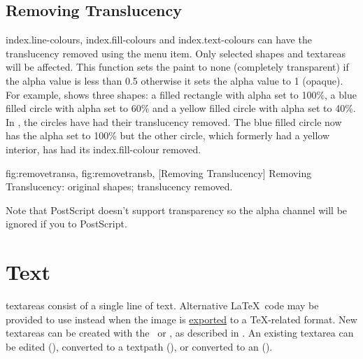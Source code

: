 
\section{Removing Translucency}\label{sec:removetrans}


\Glspl{index.line-colour}, \glspl{index.fill-colour} and
\glspl{index.text-colour} can have the \gls{translucency} removed using
the  menu item. Only selected
\glspl{shape} and \glspl{textarea} will be affected. This function
sets the paint to none (completely \gls{transparent}) if the alpha value
is less than 0.5 otherwise it sets the alpha value to 1 (opaque).
For example,  shows three shapes: a
filled rectangle with alpha set to 100\%, a blue filled circle with
alpha set to 60\% and a yellow filled circle with alpha set to 40\%.
In , the circles have had their
translucency removed. The blue filled circle now has the alpha set
to 100\% but the other circle, which formerly had a yellow interior,
has had its \gls{index.fill-colour} removed.

{
 {fig:removetransa}{}{},
 {fig:removetransb}{}{},
}
[Removing Translucency]
{Removing Translucency:  original shapes;
   translucency removed.}

\begin{warning}
Note that PostScript doesn't support transparency so the
alpha channel will be ignored if you  to PostScript.
\end{warning}


\chapter{Text}\label{sec:text}

\Glspl{textarea} consist of a single line of text. Alternative
\LaTeX\ code may be provided to use instead when the image
is \hyperref[sec:exportimage]{exported} to a \TeX-related format.
New \glspl{textarea} can be created with the
\texttool\ or \mathstool, as described in .
An existing \gls{textarea} can be edited (),
converted to a \gls{textpath} (), or
converted to an  ().

